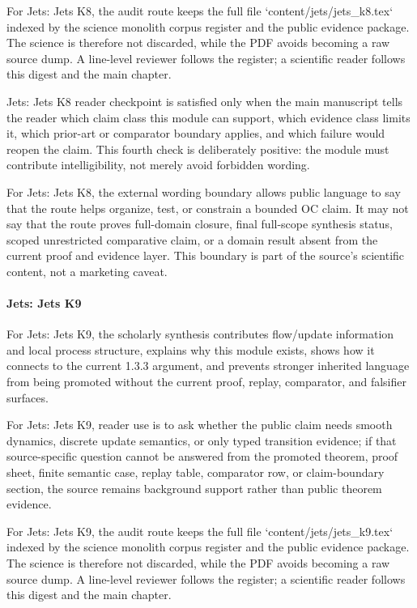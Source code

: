 For Jets: Jets K8, the audit route keeps the full file `content/jets/jets\_k8.tex` indexed by the science monolith corpus register and the public evidence package. The science is therefore not discarded, while the PDF avoids becoming a raw source dump. A line-level reviewer follows the register; a scientific reader follows this digest and the main chapter.


Jets: Jets K8 reader checkpoint is satisfied only when the main manuscript tells the reader which claim class this module can support, which evidence class limits it, which prior-art or comparator boundary applies, and which failure would reopen the claim. This fourth check is deliberately positive: the module must contribute intelligibility, not merely avoid forbidden wording.


For Jets: Jets K8, the external wording boundary allows public language to say that the route helps organize, test, or constrain a bounded OC claim. It may not say that the route proves full-domain closure, final full-scope synthesis status, scoped unrestricted comparative claim, or a domain result absent from the current proof and evidence layer. This boundary is part of the source's scientific content, not a marketing caveat.


\paragraph{Jets: Jets K9}

For Jets: Jets K9, the scholarly synthesis contributes flow/update information and local process structure, explains why this module exists, shows how it connects to the current 1.3.3 argument, and prevents stronger inherited language from being promoted without the current proof, replay, comparator, and falsifier surfaces.


For Jets: Jets K9, reader use is to ask whether the public claim needs smooth dynamics, discrete update semantics, or only typed transition evidence; if that source-specific question cannot be answered from the promoted theorem, proof sheet, finite semantic case, replay table, comparator row, or claim-boundary section, the source remains background support rather than public theorem evidence.


For Jets: Jets K9, the audit route keeps the full file `content/jets/jets\_k9.tex` indexed by the science monolith corpus register and the public evidence package. The science is therefore not discarded, while the PDF avoids becoming a raw source dump. A line-level reviewer follows the register; a scientific reader follows this digest and the main chapter.


